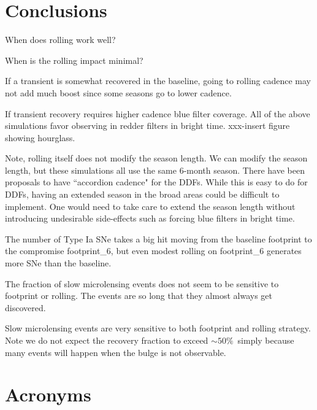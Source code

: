 \documentclass[modern]{aastex62}
\begin{document}
\section{Conclusions}

When does rolling work well? 

When is the rolling impact minimal?

If a transient is somewhat recovered in the baseline, going to rolling cadence may not add much boost since some seasons go to lower cadence.

If transient recovery requires higher cadence blue filter coverage. All of the above simulations favor observing in redder filters in bright time. xxx-insert figure showing hourglass. 


Note, rolling itself does not modify the season length.  We can modify the season length, but these simulations all use the same 6-month season. There have been proposals to have ``accordion cadence" for the DDFs. While this is easy to do for DDFs, having an extended season in the broad areas could be difficult to implement. One would need to take care to extend the season length without introducing undesirable side-effects such as forcing blue filters in bright time.


The number of Type Ia SNe takes a big hit moving from the baseline footprint to the compromise footprint\_6, but even modest rolling on footprint\_6 generates more SNe than the baseline. 

The fraction of slow microlensing events does not seem to be sensitive to footprint or rolling. The events are so long that they almost always get discovered.

Slow microlensing events are very sensitive to both footprint and rolling strategy. Note we do not expect the recovery fraction to exceed $\sim50\%$\ simply because many events will happen when the bulge is not observable. 






\section{Acronyms} \label{sec:acronyms}

\end{document}
